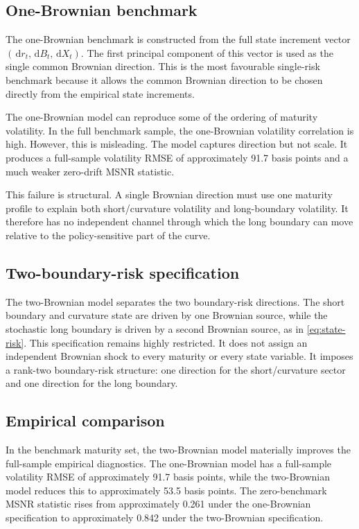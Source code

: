 \documentclass[11pt]{article}
\newcommand{\dd}{\,\mathrm{d}}
\begin{document}
\subsection{One-Brownian benchmark}

The one-Brownian benchmark is constructed from the full state increment vector $(\dd r_t,\dd B_t,\dd X_t)$. The first principal component of this vector is used as the single common Brownian direction. This is the most favourable single-risk benchmark because it allows the common Brownian direction to be chosen directly from the empirical state increments.

The one-Brownian model can reproduce some of the ordering of maturity volatility. In the full benchmark sample, the one-Brownian volatility correlation is high. However, this is misleading. The model captures direction but not scale. It produces a full-sample volatility RMSE of approximately 91.7 basis points and a much weaker zero-drift MSNR statistic.

This failure is structural. A single Brownian direction must use one maturity profile to explain both short/curvature volatility and long-boundary volatility. It therefore has no independent channel through which the long boundary can move relative to the policy-sensitive part of the curve.

\subsection{Two-boundary-risk specification}

The two-Brownian model separates the two boundary-risk directions. The short boundary and curvature state are driven by one Brownian source, while the stochastic long boundary is driven by a second Brownian source, as in \cref{eq:state-risk}. This specification remains highly restricted. It does not assign an independent Brownian shock to every maturity or every state variable. It imposes a rank-two boundary-risk structure: one direction for the short/curvature sector and one direction for the long boundary.

\subsection{Empirical comparison}

In the benchmark maturity set, the two-Brownian model materially improves the full-sample empirical diagnostics. The one-Brownian model has a full-sample volatility RMSE of approximately 91.7 basis points, while the two-Brownian model reduces this to approximately 53.5 basis points. The zero-benchmark MSNR statistic rises from approximately 0.261 under the one-Brownian specification to approximately 0.842 under the two-Brownian specification.
\end{document}
